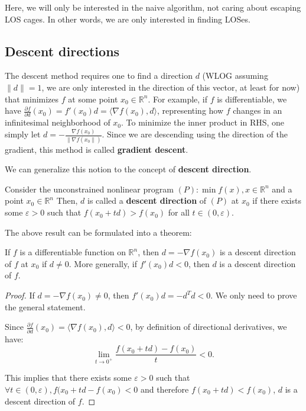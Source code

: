 Here, we will only be interested in the naive algorithm, not caring about
escaping LOS cages. In other words, we are only interested in finding LOSes.

\subsection{Descent directions} %
\label{sub:Descent directions}

The descent method requires one to find a direction \( d \) (WLOG assuming \(
\|d\| = 1 \), we are only interested in the direction of this vector, at least
for now) that minimizes \( f \) at some point \( x_{0} \in \mathbb{R}^{n} \).
For example, if \( f \) is differentiable, we have \( \frac{\partial f}{\partial
d}(x_{0}) = f'(x_{0})d = \langle \nabla f(x_{0}), d \rangle \), representing how
\( f \) changes in an infinitesimal neighborhood of \( x_{0} \). To minimize the
inner product in RHS, one simply let \( d = -\frac{\nabla f(x_{0})}{\|\nabla
f(x_{0}\|)} \). Since we are descending using the direction of the gradient,
this method is called \textbf{gradient descent}.

We can generalize this notion to the concept of \textbf{descent direction}.

\begin{definition}
\label{def:Descent direction}
  Consider the unconstrained nonlinear program \( (P): \min f(x), x \in
  \mathbb{R}^{n} \) and a point \( x_{0} \in \mathbb{R}^{n} \) Then,
  \( d \) is called a \textbf{descent direction} of \( (P) \) at \( x_{0}
    \) if there exists some \( \varepsilon > 0 \) such that \(    f(x_{0} + t d)
    > f(x_{0}) \) for all \( t \in (0, \varepsilon)    \).
\end{definition}

The above result can be formulated into a theorem:

\begin{theorem}
\label{thr:Negative gradient is a descent direction}
  If \( f \) is a differentiable function on \( \mathbb{R}^{n} \), then \( d =
  -\nabla f(x_{0}) \) is a descent direction of \( f \) at \( x_{0} \) if \( d
  \neq 0 \). More generally, if \( f'(x_{0})d < 0 \), then \( d \) is a descent
  direction of \( f \).
\end{theorem}

\begin{proof}
  If \( d = -\nabla f(x_{0}) \neq 0 \), then \( f'(x_{0})d = -d^{T}d < 0 \). We
  only need to prove the general statement.

  Since \( \frac{\partial f}{\partial d}(x_{0}) = \langle \nabla f(x_{0}), d
  \rangle < 0 \), by definition of directional derivatives, we have:
  \[
    \lim_{t \to  0^{+}} \frac{f(x_{0} + t d) - f(x_{0})}{t} < 0
  .\] 

  This implies that there exists some \( \varepsilon > 0 \) such that \( \forall
  t \in (0, \varepsilon), f(x_{0} + t d - f(x_{0}) < 0\) and therefore \(
  f(x_{0} + t d) < f(x_{0}) \), \( d \) is a descent direction of \( f \).
\end{proof}

